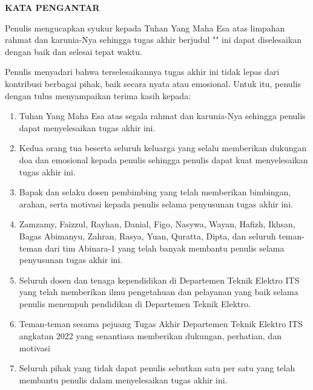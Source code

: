 \begin{center}
  \Large
  \textbf{KATA PENGANTAR}
\end{center}


\vspace{2ex}



Penulis mengucapkan syukur kepada Tuhan Yang Maha Esa atas limpahan rahmat dan karunia-Nya sehingga tugas akhir berjudul "\tatitle{}" ini dapat diselesaikan dengan baik dan selesai tepat waktu.

Penulis menyadari bahwa terselesaikannya tugas akhir ini tidak lepas dari kontribusi berbagai pihak, baik secara nyata atau emosional. Untuk itu, penulis dengan tulus menyampaikan terima kasih kepada:  

\begin{enumerate}[nolistsep]

  \item Tuhan Yang Maha Esa atas segala rahmat dan karunia-Nya sehingga penulis
  dapat menyelesaikan tugas akhir ini.
  \item Kedua orang tua beserta seluruh keluarga yang selalu memberikan dukungan doa dan emosional kepada penulis sehingga penulis dapat kuat menyelesaikan tugas akhir ini.
  \item Bapak \advisor{} dan \coadvisor{} selaku dosen pembimbing yang
  telah memberikan bimbingan, arahan, serta motivasi kepada penulis selama
  penyusunan tugas akhir ini.
  \item Zamzamy, Faizzul, Rayhan, Danial, Figo, Nasywa, Wayan,
  Hafizh, Ikhsan, Bagas Abimanyu, Zahran, Rasya, Yuan, Quratta, Dipta, dan 
  seluruh teman-teman dari tim Abinara-1 yang telah banyak membantu penulis
  selama penyusunan tugas akhir ini.
  \item Seluruh dosen dan tenaga kependidikan di Departemen Teknik Elektro ITS
  yang telah memberikan ilmu pengetahuan dan pelayanan yang baik selama
  penulis menempuh pendidikan di Departemen Teknik Elektro.
  \item Teman-teman sesama pejuang Tugas Akhir Departemen Teknik Elektro ITS angkatan 2022 yang senantiasa memberikan dukungan, perhatian, dan motivasi 
  \item Seluruh pihak yang tidak dapat penulis sebutkan satu per satu yang telah
  membantu penulis dalam menyelesaikan tugas akhir ini.
\end{enumerate}

